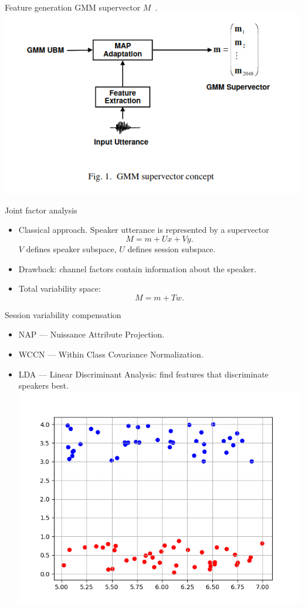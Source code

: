 \documentclass{beamer}
\begin{document}
\begin{frame}{Feature generation}
GMM supervector $M$~\cite{Reynolds}. 
\includegraphics[scale=0.5]{image_supervector.png}
\end{frame}

\begin{frame}{Joint factor analysis}
\begin{itemize}
 \item Classical approach.  Speaker utterance is represented by a supervector
 $$M=m + Ux + Vy.$$
 $V$ defines speaker subspace, $U$ defines session subspace. 
 \item Drawback: channel factors contain information about the speaker.
 \item Total variability space:
 $$M = m + Tw.$$
\end{itemize}
\end{frame}

\begin{frame}{Session variability compensation}
\begin{itemize}
 \item NAP --- Nuissance Attribute Projection.
 \item WCCN --- Within Class Covariance Normalization. 
 \item LDA --- Linear Discriminant Analysis: find features that discriminate speakers best. 
 \includegraphics[scale=0.5]{image_scatter.png}
\end{itemize} 
\end{frame}
\end{document}
